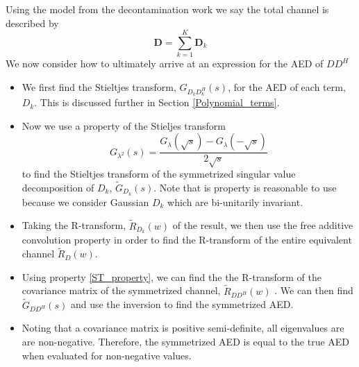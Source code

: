 \documentclass[12pt,a4paper]{report}
\begin{document}
Using the model from the decontamination work we say the total channel is described by 
\begin{equation}
\mathbf{D} = \sum_{k=1}^{K}\mathbf{D}_k 
\end{equation}
We now consider how to ultimately arrive at an expression for the AED of $DD^H$
\begin{itemize}

\item 
	We first find the Stieltjes transform, $G_{D_kD_k^H}(s)$, for the AED of each term, $D_k$.
	This is discussed further in Section \ref{Polynomial_terms}.
\item
	Now we use a property of the Stieljes transform
	\begin{equation}\label{ST_property}
	G_{\lambda^2}(s) = \frac{G_{\lambda}(\sqrt{s})- G_{\lambda}(-\sqrt{s})}{2\sqrt{s}}
	\end{equation}
	to find the Stieltjes transform of the symmetrized singular value decomposition of
	 $D_k$, $\tilde{G}_{D_k}(s)$. Note that is property is reasonable to use because
	 we consider Gaussian  $D_k$ which are bi-unitarily invariant.
\item
	Taking the R-transform, $\tilde{R}_{D_k}(w)$ of the result, we then use the free additive convolution property in order to 
	find the R-transform of the entire equivalent channel $\tilde{R}_{D}(w)$. 
\item
	Using property \eqref{ST_property}, we can find the the R-transform of the 
	covariance matrix of the symmetrized channel, $\tilde{R}_{DD^H}(w)$ . We can then find $\tilde{G}_{DD^H}(s)$ and 
	use the inversion to find the symmetrized AED.

\item 
	Noting that a covariance matrix is positive semi-definite, all eigenvalues are are non-negative. Therefore,
	the symmetrized AED is equal to the true AED when evaluated for non-negative values. 

\end{itemize}
\end{document}
